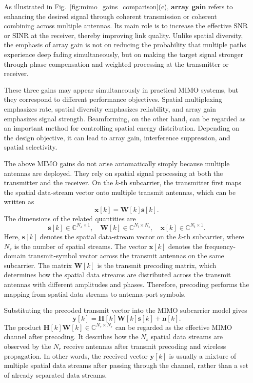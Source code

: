 As illustrated in Fig.~\ref{fig:mimo_gains_comparison}(c),
\textbf{array gain} refers to enhancing the desired signal through coherent transmission
or coherent combining across multiple antennas.
Its main role is to increase the effective SNR or SINR at the receiver,
thereby improving link quality.
Unlike spatial diversity,
the emphasis of array gain is not on reducing the probability that multiple paths experience deep fading simultaneously,
but on making the target signal stronger through phase compensation and weighted processing
at the transmitter or receiver.

These three gains may appear simultaneously in practical MIMO systems,
but they correspond to different performance objectives.
Spatial multiplexing emphasizes rate,
spatial diversity emphasizes reliability,
and array gain emphasizes signal strength.
Beamforming,
on the other hand,
can be regarded as an important method for controlling spatial energy distribution.
Depending on the design objective,
it can lead to array gain,
interference suppression,
and spatial selectivity.

The above MIMO gains do not arise automatically simply because multiple antennas are deployed.
They rely on spatial signal processing at both the transmitter and the receiver.
On the \(k\)-th subcarrier,
the transmitter first maps the spatial data-stream vector onto multiple transmit antennas,
which can be written as
\begin{equation}
\mathbf{x}[k]
=
\mathbf{W}[k]\mathbf{s}[k].
\label{eq:mimo_precoding}
\end{equation}
The dimensions of the related quantities are
\[
\mathbf{s}[k]\in\mathbb{C}^{N_s\times 1},
\quad
\mathbf{W}[k]\in\mathbb{C}^{N_t\times N_s},
\quad
\mathbf{x}[k]\in\mathbb{C}^{N_t\times 1}.
\]
Here,
\(\mathbf{s}[k]\) denotes the spatial data-stream vector on the \(k\)-th subcarrier,
where \(N_s\) is the number of spatial streams.
The vector \(\mathbf{x}[k]\) denotes the frequency-domain transmit-symbol vector
across the transmit antennas on the same subcarrier.
The matrix \(\mathbf{W}[k]\) is the transmit precoding matrix,
which determines how the spatial data streams are distributed across the transmit antennas
with different amplitudes and phases.
Therefore,
precoding performs the mapping from spatial data streams to antenna-port symbols.

Substituting the precoded transmit vector into the MIMO subcarrier model gives
\begin{equation}
\mathbf{y}[k]
=
\mathbf{H}[k]\mathbf{W}[k]\mathbf{s}[k]
+
\mathbf{n}[k].
\label{eq:mimo_precoded_channel}
\end{equation}
The product
\(\mathbf{H}[k]\mathbf{W}[k]\in\mathbb{C}^{N_r\times N_s}\)
can be regarded as the effective MIMO channel after precoding.
It describes how the \(N_s\) spatial data streams are observed by the \(N_r\) receive antennas
after transmit precoding and wireless propagation.
In other words,
the received vector \(\mathbf{y}[k]\) is usually a mixture of multiple spatial data streams after passing through the channel,
rather than a set of already separated data streams.

